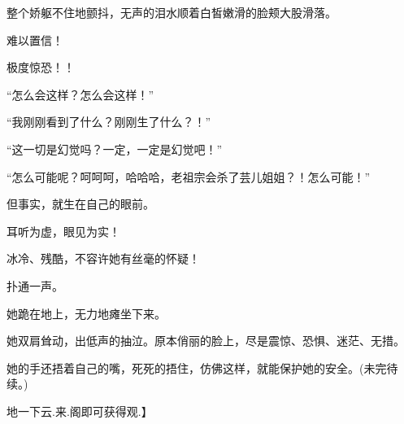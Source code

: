 \begin{this_body}
整个娇躯不住地颤抖，无声的泪水顺着白皙嫩滑的脸颊大股滑落。

难以置信！

极度惊恐！！

“怎么会这样？怎么会这样！”

“我刚刚看到了什么？刚刚生了什么？！”

“这一切是幻觉吗？一定，一定是幻觉吧！”

“怎么可能呢？呵呵呵，哈哈哈，老祖宗会杀了芸儿姐姐？！怎么可能！”

但事实，就生在自己的眼前。

耳听为虚，眼见为实！

冰冷、残酷，不容许她有丝毫的怀疑！

扑通一声。

她跪在地上，无力地瘫坐下来。

她双肩耸动，出低声的抽泣。原本俏丽的脸上，尽是震惊、恐惧、迷茫、无措。

她的手还捂着自己的嘴，死死的捂住，仿佛这样，就能保护她的安全。(未完待续。)

地一下云.来.阁即可获得观.】

\end{this_body}

